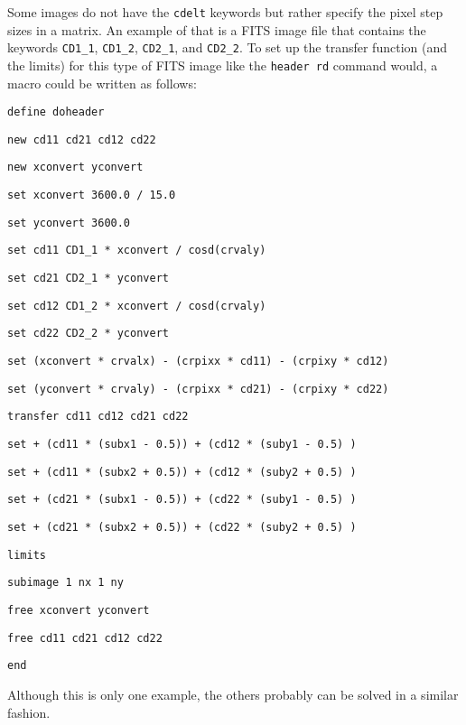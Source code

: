 Some images do not have the {\tt cdelt} keywords but rather specify the
pixel step sizes in a matrix.
An example of that is a FITS image file that contains the keywords
{\tt CD1\_1}, {\tt CD1\_2}, {\tt CD2\_1}, and {\tt CD2\_2}.
To set up the transfer function (and the limits) for this type of FITS
image like the {\tt header rd} command would,
a macro could be written as follows:
\begin{wiplist}%
  \item {\tt define doheader}
\samepage
  \item {\tt new cd11 cd21 cd12 cd22}
  \item {\tt new xconvert yconvert}
  \item {\tt set xconvert 3600.0 / 15.0}
  \item {\tt set yconvert 3600.0}
  \item {\tt set cd11 CD1\_1 * xconvert / cosd(crvaly)}
  \item {\tt set cd21 CD2\_1 * yconvert}
  \item {\tt set cd12 CD1\_2 * xconvert / cosd(crvaly)}
  \item {\tt set cd22 CD2\_2 * yconvert}
  \item {\tt set  (xconvert * crvalx) - (crpixx * cd11) - (crpixy * cd12)}
  \item {\tt set  (yconvert * crvaly) - (crpixx * cd21) - (crpixy * cd22)}
  \item {\tt transfer  cd11 cd12  cd21 cd22}
  \item {\tt set   + (cd11 * (subx1 - 0.5)) + (cd12 * (suby1 - 0.5) )}
  \item {\tt set   + (cd11 * (subx2 + 0.5)) + (cd12 * (suby2 + 0.5) )}
  \item {\tt set   + (cd21 * (subx1 - 0.5)) + (cd22 * (suby1 - 0.5) )}
  \item {\tt set   + (cd21 * (subx2 + 0.5)) + (cd22 * (suby2 + 0.5) )}
  \item {\tt limits    }
  \item {\tt subimage 1 nx 1 ny}
  \item {\tt free xconvert yconvert}
  \item {\tt free cd11 cd21 cd12 cd22}
  \item {\tt end}
\end{wiplist}
Although this is only one example,
the others probably can be solved in a similar fashion.

